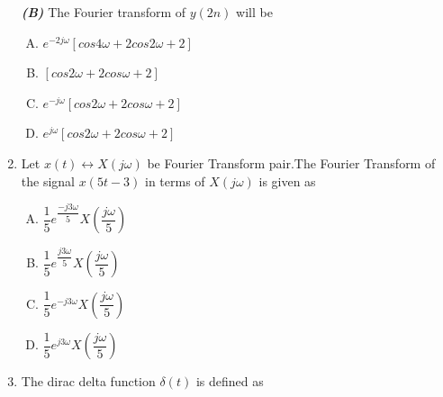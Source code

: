\documentclass[journal,12pt,twocolumn]{IEEEtran}
\begin{document}
\begin{enumerate}[1.]
\textbf{\textit{(B)}} The Fourier transform of $y(2n)$ will be\\
\begin{enumerate}[(A)]

\setlength\itemsep{1em}

\item $
e^{-2j\omega}[cos 4\omega +2 cos 2\omega +2]
$ 
\item $
[cos2\omega +2 cos\omega +2]
$ 
\item  $
e^{-j\omega}[cos2\omega +2 cos\omega +2]
$ 
\item $
e^{j\omega}[cos2\omega +2 cos\omega +2]
$

\end{enumerate}


\item Let $x(t)\leftrightarrow X(j\omega)$ be Fourier Transform pair.The Fourier Transform of the signal $x(5t-3)$ in terms of $X(j\omega)$ is given as\\
\begin{enumerate}[(A)]

\setlength\itemsep{1em}

\item $
\dfrac{1}{5}e^{\dfrac{-j3\omega}{5}}X(\dfrac{j\omega}{5})
$ 
\item $
\dfrac{1}{5}e^{\dfrac{j3\omega}{5}}X(\dfrac{j\omega}{5})
$ 
\item  $
\dfrac{1}{5}e^{-j3\omega}X(\dfrac{j\omega}{5})
$ 
\item $
\dfrac{1}{5}e^{j3\omega}X(\dfrac{j\omega}{5})
$

\end{enumerate}




\item The dirac delta function $\delta(t)$ is defined as

\begin{enumerate}[(A)]

\setlength\itemsep{1em}


\end{enumerate}
\end{enumerate}
\end{document}
